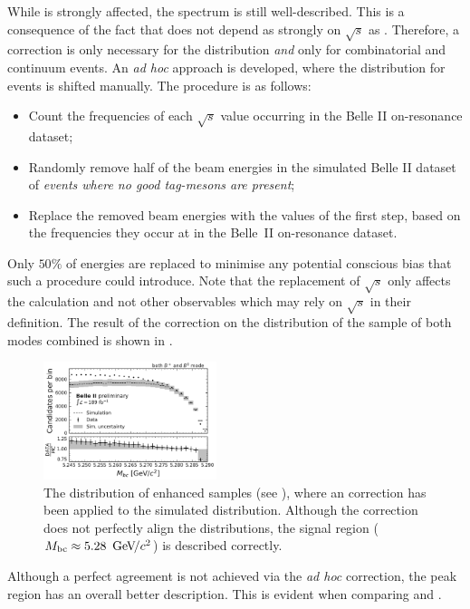 While \Mbc is strongly affected, the \EB spectrum is still well-described.
This is a consequence of the fact that \EB does not depend as strongly on $\sqrt{s}$ as \Mbc.
Therefore, a correction is only necessary for the \Mbc distribution \textit{and} only for combinatorial \BB and continuum events.
An \textit{ad hoc} approach is developed, where the \Mbc distribution for \MC events is shifted manually. 
The procedure is as follows:
\begin{itemize}
    \item Count the frequencies of each $\sqrt{s}$ value occurring in the Belle II on-resonance dataset;
    \item Randomly remove half of the beam energies in the simulated Belle II dataset of \textit{events where no good tag-\B mesons are present};
    \item Replace the removed beam energies with the values of the first step, based on the frequencies they occur at in the Belle~II on-resonance dataset.
\end{itemize}
Only $50\%$ of energies are replaced to minimise any potential conscious bias that such a procedure could introduce.
Note that the replacement of $\sqrt{s}$ only affects the \Mbc calculation and not other observables which may rely on $\sqrt{s}$ in their definition.
The result of the correction on the \Mbc distribution of the sample of both \FEI modes combined is shown in .
\begin{figure}[htbp!]
    \centering
    \includegraphics[width=0.45\textwidth]{figures/data_validation/Bboth_qqbar_enhanced_mbccorrected.pdf}
    \caption{\label{fig:qqbar_enhanced_mbccorrected} The \Mbc distribution of \qqbar enhanced samples (see ),
    where an \Mbc correction has been applied to the simulated distribution.
    Although the correction does not perfectly align the distributions, the signal region (${M_{\mathrm{bc}}}\approx5.28~{\mathrm{\,Ge\kern -0.1em V\!/}c^2}$) is described correctly.}
\end{figure}
Although a perfect agreement is not achieved via the \textit{ad hoc} correction, the peak region has an overall better description. 
This is evident when comparing  and .

